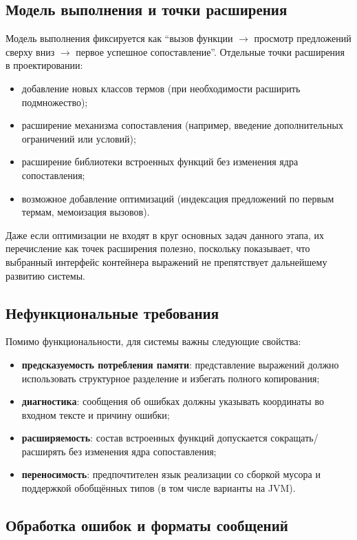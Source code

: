 \documentclass[14pt, russian]{scrartcl}
\newcommand{\enq}[1]{\enquote{#1}}
\begin{document}
\subsection{Модель выполнения и точки расширения}

Модель выполнения фиксируется как \enq{вызов функции \(\rightarrow\) просмотр предложений сверху вниз \(\rightarrow\) первое успешное сопоставление}.
Отдельные точки расширения в проектировании:
\begin{itemize}
  \item добавление новых классов термов (при необходимости расширить подмножество);
  \item расширение механизма сопоставления (например, введение дополнительных ограничений или условий);
  \item расширение библиотеки встроенных функций без изменения ядра сопоставления;
  \item возможное добавление оптимизаций (индексация предложений по первым термам, мемоизация вызовов).
\end{itemize}

Даже если оптимизации не входят в круг основных задач данного этапа, их перечисление как точек расширения полезно, поскольку показывает,
что выбранный интерфейс контейнера выражений не препятствует дальнейшему развитию системы.

\subsection{Нефункциональные требования}

Помимо функциональности, для системы важны следующие свойства:
\begin{itemize}
  \item \textbf{предсказуемость потребления памяти}: представление выражений должно использовать структурное разделение и избегать полного копирования;
  \item \textbf{диагностика}: сообщения об ошибках должны указывать координаты во входном тексте и причину ошибки;
  \item \textbf{расширяемость}: состав встроенных функций допускается сокращать/расширять без изменения ядра сопоставления;
  \item \textbf{переносимость}: предпочтителен язык реализации со сборкой мусора и поддержкой обобщённых типов
        (в том числе варианты на JVM).
\end{itemize}

\subsection{Обработка ошибок и форматы сообщений}
\end{document}
